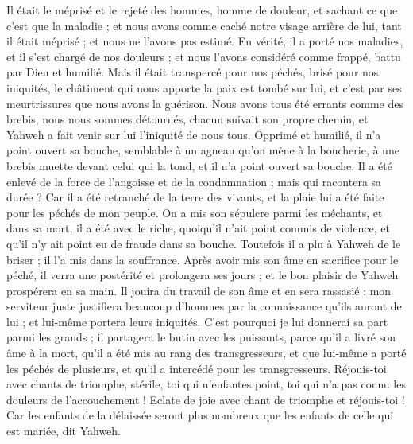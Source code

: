 \begin{multicols}{2}
Il était le méprisé et le rejeté des hommes, homme de douleur, et sachant ce que c'est que la maladie ; et nous avons comme caché notre visage arrière de lui, tant il était méprisé ; et nous ne l'avons pas estimé.
En vérité, il a porté nos maladies, et il s'est chargé de nos douleurs ; et nous l'avons considéré comme frappé, battu par Dieu et humilié.
Mais il était transpercé pour nos péchés, brisé pour nos iniquités, le châtiment qui nous apporte la paix est tombé sur lui, et c'est par ses meurtrissures que nous avons la guérison.
Nous avons tous été errants comme des brebis, nous nous sommes détournés, chacun suivait son propre chemin, et Yahweh a fait venir sur lui l'iniquité de nous tous.
Opprimé et humilié, il n'a point ouvert sa bouche, semblable à un agneau qu'on mène à la boucherie, à une brebis muette devant celui qui la tond, et il n'a point ouvert sa bouche.
Il a été enlevé de la force de l'angoisse et de la condamnation ; mais qui racontera sa durée ? Car il a été retranché de la terre des vivants, et la plaie lui a été faite pour les péchés de mon peuple.
On a mis son sépulcre parmi les méchants, et dans sa mort, il a été avec le riche, quoiqu'il n'ait point commis de violence, et qu'il n'y ait point eu de fraude dans sa bouche.
Toutefois il a plu à Yahweh de le briser ; il l'a mis dans la souffrance. Après avoir mis son âme en sacrifice pour le péché, il verra une postérité et prolongera ses jours ; et le bon plaisir de Yahweh prospérera en sa main.
Il jouira du travail de son âme et en sera rassasié ; mon serviteur juste justifiera beaucoup d'hommes par la connaissance qu'ils auront de lui ; et lui-même portera leurs iniquités.
C'est pourquoi je lui donnerai sa part parmi les grands ; il partagera le butin avec les puissants, parce qu'il a livré son âme à la mort, qu'il a été mis au rang des transgresseurs, et que lui-même a porté les péchés de plusieurs, et qu'il a intercédé pour les transgresseurs.
\VerseOne{}Réjouis-toi avec chants de triomphe, stérile, toi qui n'enfantes point, toi qui n'a pas connu les douleurs de l'accouchement ! Eclate de joie avec chant de triomphe et réjouis-toi ! Car les enfants de la délaissée seront plus nombreux que les enfants de celle qui est mariée, dit Yahweh.

\end{multicols}
